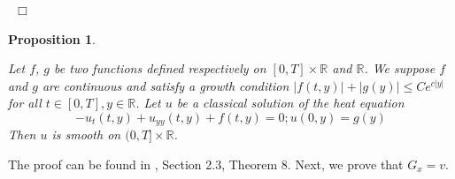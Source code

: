 \documentclass[11pt, psfig]{article}
\newtheorem{proposition}[theorem]{Proposition}
\theoremstyle{definition}
\theoremstyle{remark}
\numberwithin{equation}{section}
\def\sR{\mathbb{R}}
\def\sR{\mathbb{R}}
\newcommand{\be}{\begin{equation}}
\newcommand{\ee}{\end{equation}}
\def \proof{{\noindent \bf Proof}\quad}
\def \ep{\hbox{ }\hfill$\Box$}
\begin{document}
\ep




\begin{proposition}\label{smooth_solution}

Let $f$, $g$ be two functions defined respectively on $[0,T]\times \sR$ and $\sR$. We suppose $f$ and $g$ are continuous and satisfy a growth condition $|f(t,y)| +|g(y)| \leq C e^{c|y|} $ for all $t\in [0,T], y\in \sR$.
Let $u$ be a classical solution of the heat equation 
\be
-u_{t}(t,y) + u_{yy}(t,y) + f(t,y)=0 ; u(0,y) =g(y)
\ee
Then $u$ is smooth on $(0,T]\times \sR$.
\end{proposition}


The proof can be found in \cite{Ev1}, Section 2.3, Theorem 8.
Next, we prove that $G_x=v$.
\end{document}
